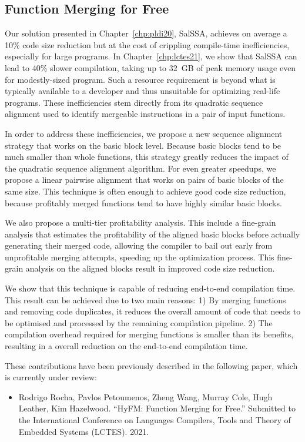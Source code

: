 \subsection{Function Merging for Free}


Our solution presented in Chapter~\ref{chp:pldi20}, SalSSA, achieves on average a 10\% code size reduction but at the cost of crippling compile-time inefficiencies, especially for large programs.
In Chapter~\ref{chp:lctes21}, we show that SalSSA can lead to 40\% slower compilation, taking up to 32~GB of peak memory usage even for modestly-sized program.
Such a resource requirement is beyond what is typically available to a developer and thus unsuitable for optimizing real-life programs.
These inefficiencies stem directly from its quadratic sequence alignment used to identify mergeable instructions in a pair of input functions.

In order to address these inefficiencies, we propose a new sequence alignment strategy that works on the basic block level.
Because basic blocks tend to  be much smaller than whole functions, this strategy greatly reduces the impact of the quadratic sequence alignment algorithm.
For even greater speedups, we propose a linear pairwise alignment that works on pairs of basic blocks of the same size. 
This technique is often enough to achieve good code size reduction, because profitably merged functions tend to have highly similar basic blocks.

We also propose a multi-tier profitability analysis.
This include a fine-grain analysis that estimates the profitability of the aligned basic blocks before actually generating their merged code,
allowing the compiler to bail out early from unprofitable merging attempts, speeding up the optimization process.
This fine-grain analysis on the aligned blocks result in improved code size reduction.

We show that this technique is capable of reducing end-to-end compilation time.
This result can be achieved due to two main reasons:
1) By merging functions and removing code duplicates, it reduces the overall amount of code that needs to be optimised and processed by the remaining compilation pipeline.
2) The compilation overhead required for merging functions is smaller than its benefits, resulting in a overall reduction on the end-to-end compilation time.

These contributions have been previously described in the following paper, which is currently under review:
\begin{itemize}
\item Rodrigo Rocha, Pavlos Petoumenos, Zheng Wang, Murray Cole, Hugh Leather, Kim Hazelwood. ``HyFM: Function Merging for Free.'' Submitted to the International Conference on Languages Compilers, Tools and Theory of Embedded Systems (LCTES). 2021.
\end{itemize}

